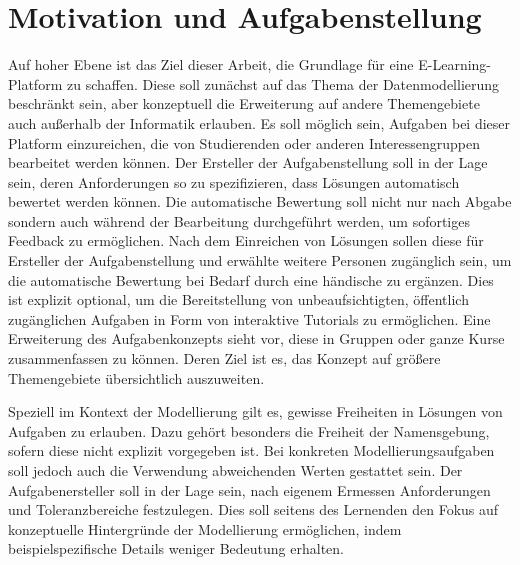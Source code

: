 \chapter{Motivation und Aufgabenstellung}\label{ch:motivation-and-task-description}

Auf hoher Ebene ist das Ziel dieser Arbeit, die Grundlage für eine E-Learning-Platform zu schaffen.
Diese soll zunächst auf das Thema der Datenmodellierung beschränkt sein, aber konzeptuell die Erweiterung auf andere Themengebiete auch außerhalb der Informatik erlauben.
Es soll möglich sein, Aufgaben bei dieser Platform einzureichen, die von Studierenden oder anderen Interessengruppen bearbeitet werden können.
Der Ersteller der Aufgabenstellung soll in der Lage sein, deren Anforderungen so zu spezifizieren, dass Lösungen automatisch bewertet werden können.
Die automatische Bewertung soll nicht nur nach Abgabe sondern auch während der Bearbeitung durchgeführt werden, um sofortiges Feedback zu ermöglichen.
Nach dem Einreichen von Lösungen sollen diese für Ersteller der Aufgabenstellung und erwählte weitere Personen zugänglich sein, um die automatische Bewertung bei Bedarf durch eine händische zu ergänzen.
Dies ist explizit optional, um die Bereitstellung von unbeaufsichtigten, öffentlich zugänglichen Aufgaben in Form von interaktive Tutorials zu ermöglichen.
Eine Erweiterung des Aufgabenkonzepts sieht vor, diese in Gruppen oder ganze Kurse zusammenfassen zu können.
Deren Ziel ist es, das Konzept auf größere Themengebiete übersichtlich auszuweiten.

Speziell im Kontext der Modellierung gilt es, gewisse Freiheiten in Lösungen von Aufgaben zu erlauben.
Dazu gehört besonders die Freiheit der Namensgebung, sofern diese nicht explizit vorgegeben ist.
Bei konkreten Modellierungsaufgaben soll jedoch auch die Verwendung abweichenden Werten gestattet sein.
Der Aufgabenersteller soll in der Lage sein, nach eigenem Ermessen Anforderungen und Toleranzbereiche festzulegen.
Dies soll seitens des Lernenden den Fokus auf konzeptuelle Hintergründe der Modellierung ermöglichen, indem beispielspezifische Details weniger Bedeutung erhalten.
